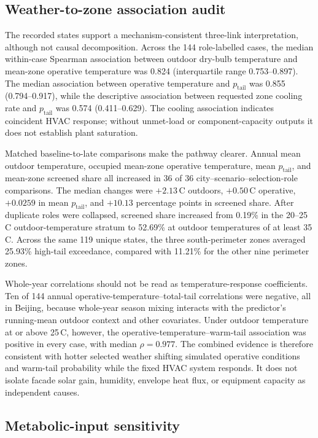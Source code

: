 \subsection{Weather-to-zone association audit}

The recorded states support a mechanism-consistent three-link interpretation, although not causal decomposition. Across the 144 role-labelled cases, the median within-case Spearman association between outdoor dry-bulb temperature and mean-zone operative temperature was 0.824 (interquartile range 0.753--0.897). The median association between operative temperature and $p_{\mathrm{tail}}$ was 0.855 (0.794--0.917), while the descriptive association between requested zone cooling rate and $p_{\mathrm{tail}}$ was 0.574 (0.411--0.629). The cooling association indicates coincident HVAC response; without unmet-load or component-capacity outputs it does not establish plant saturation.

Matched baseline-to-late comparisons make the pathway clearer. Annual mean outdoor temperature, occupied mean-zone operative temperature, mean $p_{\mathrm{tail}}$, and mean-zone screened share all increased in 36 of 36 city--scenario--selection-role comparisons. The median changes were $+2.13$\,\degree C outdoors, $+0.50$\,\degree C operative, $+0.0259$ in mean $p_{\mathrm{tail}}$, and $+10.13$ percentage points in screened share. After duplicate roles were collapsed, screened share increased from 0.19\% in the 20--25\,\degree C outdoor-temperature stratum to 52.69\% at outdoor temperatures of at least 35\,\degree C. Across the same 119 unique states, the three south-perimeter zones averaged 25.93\% high-tail exceedance, compared with 11.21\% for the other nine perimeter zones.

Whole-year correlations should not be read as temperature-response coefficients. Ten of 144 annual operative-temperature--total-tail correlations were negative, all in Beijing, because whole-year season mixing interacts with the predictor's running-mean outdoor context and other covariates. Under outdoor temperature at or above 25\,\degree C, however, the operative-temperature--warm-tail association was positive in every case, with median $\rho=0.977$. The combined evidence is therefore consistent with hotter selected weather shifting simulated operative conditions and warm-tail probability while the fixed HVAC system responds. It does not isolate facade solar gain, humidity, envelope heat flux, or equipment capacity as independent causes.

\subsection{Metabolic-input sensitivity}

